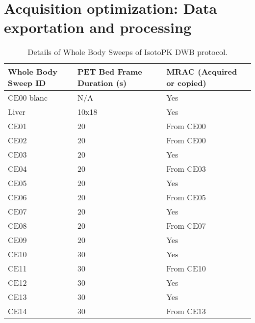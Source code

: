 \chapter{Acquisition optimization: Data exportation and processing}
\label{chap:AppendixA}

\begin{table}[]
\centering
\label{tab:IsotPK_CE_details}
\caption{Details of Whole Body Sweeps of IsotoPK DWB protocol.}
\begin{tabular}{|l|l|l|}
\toprule
\textbf{Whole Body Sweep ID} & \textbf{PET Bed Frame Duration (s)}                   & \textbf{MRAC (Acquired or copied)} \\
\midrule
CE00 blanc          & {N/A}                                          & Yes  \\
Liver               & 10x18                                          & Yes  \\
CE01                & 20                                             & From CE00     \\
CE02                & 20                                             & From CE00     \\
CE03                & 20                                             & Yes           \\
CE04                & 20                                             & From CE03     \\
CE05                & 20                                             & Yes  \\
CE06                & 20                                             & From CE05     \\
CE07                & 20                                             & Yes  \\
CE08                & 20                                             & From CE07     \\
CE09                & 20                                             & Yes  \\
CE10                & 30                                             & Yes  \\
CE11                & 30                                             & From CE10     \\
CE12                & 30                                             & Yes  \\
CE13                & 30                                             & Yes  \\
CE14                & 30                                             & From CE13     \\

\end{tabular}
\end{table}
